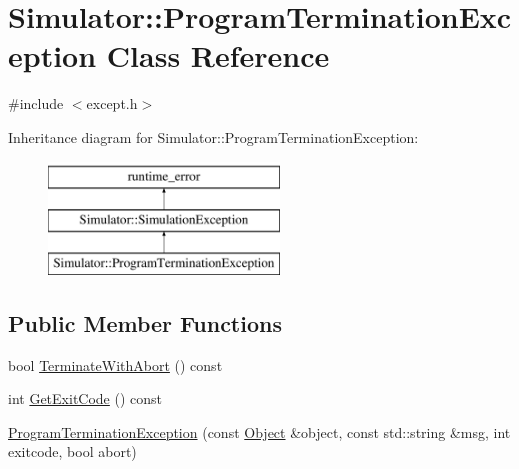 \hypertarget{class_simulator_1_1_program_termination_exception}{\section{Simulator\+:\+:Program\+Termination\+Exception Class Reference}
\label{class_simulator_1_1_program_termination_exception}
}


{\ttfamily \#include $<$except.\+h$>$}

Inheritance diagram for Simulator\+:\+:Program\+Termination\+Exception\+:\begin{figure}[H]
\begin{center}
\leavevmode
\includegraphics[height=3.000000cm]{class_simulator_1_1_program_termination_exception}
\end{center}
\end{figure}
\subsection*{Public Member Functions}
\begin{DoxyCompactItemize}
\item 
bool \hyperlink{class_simulator_1_1_program_termination_exception_abbbed23f67532eb017b2fb92048d0418}{Terminate\+With\+Abort} () const 
\item 
int \hyperlink{class_simulator_1_1_program_termination_exception_a37bc807716c107df2352c44a29f303b7}{Get\+Exit\+Code} () const 
\item 
\hyperlink{class_simulator_1_1_program_termination_exception_a884c4949381cf40158c968e9abdbbad3}{Program\+Termination\+Exception} (const \hyperlink{class_simulator_1_1_object}{Object} \&object, const std\+::string \&msg, int exitcode, bool abort)
\end{DoxyCompactItemize}


